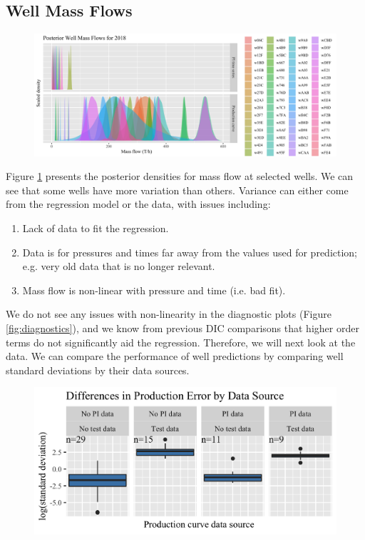 \documentclass[a4paper, 12pt]{article}
\begin{document}
\subsection{Well Mass Flows}
\begin{figure}
\centering
  \includegraphics[width=\linewidth]{media/mf_wells}
  \label{fig:mf_wells}
\end{figure}

Figure \ref{fig:mf_wells} presents the posterior densities for mass flow at selected wells. We can see that some wells have more variation than others. Variance can either come from the regression model or the data, with issues including:

\begin{enumerate}
\item Lack of data to fit the regression.
\item Data is for pressures and times far away from the values used for prediction; e.g. very old data that is no longer relevant.
\item Mass flow is non-linear with pressure and time (i.e. bad fit).
\end{enumerate}

We do not see any issues with non-linearity in the diagnostic plots (Figure \ref{fig:diagnostics}), and we know from previous DIC comparisons that higher order terms do not significantly aid the regression. Therefore, we will next look at the data. We can compare the performance of well predictions by comparing well standard deviations by their data sources.

\begin{figure}
  \centering
  \includegraphics[width=.5\linewidth]{media/error_source}
  \label{fig:error_source}
\end{figure}
\end{document}
